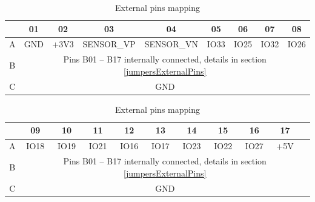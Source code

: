 \begin{table}[H]
	\centering
	\begin{tabular}{|c||c|c|c|c|c|c|c|c|}
		\hline
		& 01 & 02 & 03 & 04 & 05 & 06 & 07 & 08 \\
		\hline \hline
		A & GND & +3V3 & SENSOR\_VP & SENSOR\_VN & IO33 & IO25 & IO32 & IO26 \\
		B & \multicolumn{8}{|c|}{Pins B01 -- B17 internally connected, details in section \ref{jumpersExternalPins}} \\
		C & \multicolumn{8}{|c|}{GND} \\
		\hline
	\end{tabular}

	\vspace{0.5cm}
	
	\begin{tabular}{|c||c|c|c|c|c|c|c|c|c|c|}
		\hline
		& 09 & 10 & 11 & 12 & 13 & 14 & 15 & 16 & 17 & \\
		\hline \hline
		A & IO18 & IO19 & IO21 & IO16 & IO17 & IO23 & IO22 & IO27 & +5V & \\
		B & \multicolumn{10}{|c|}{Pins B01 -- B17 internally connected, details in section \ref{jumpersExternalPins}} \\
		C & \multicolumn{10}{|c|}{GND} \\
		\hline
	\end{tabular}
	\caption{External pins mapping}
	\label{tab:externalPins}
\end{table}

